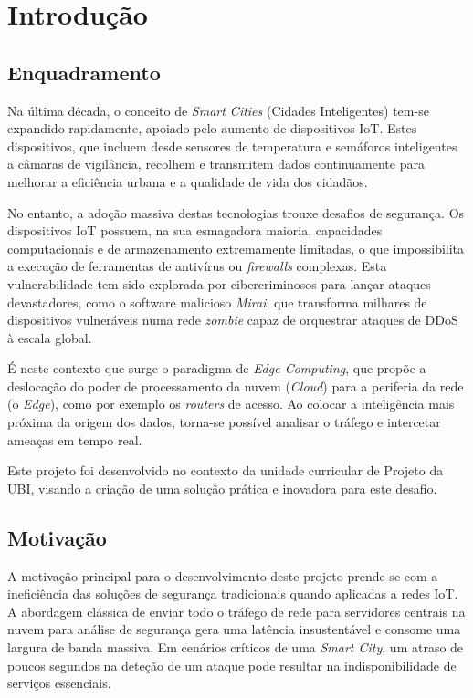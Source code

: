 \chapter{Introdução}
\label{chap:intro}

\section{Enquadramento}
\label{sec:amb}

Na última década, o conceito de \textit{Smart Cities} (Cidades Inteligentes) tem-se expandido rapidamente, apoiado pelo aumento de dispositivos \ac{IoT}. Estes dispositivos, que incluem desde sensores de temperatura e semáforos inteligentes a câmaras de vigilância, recolhem e transmitem dados continuamente para melhorar a eficiência urbana e a qualidade de vida dos cidadãos.

No entanto, a adoção massiva destas tecnologias trouxe desafios de segurança. Os dispositivos \ac{IoT} possuem, na sua esmagadora maioria, capacidades computacionais e de armazenamento extremamente limitadas, o que impossibilita a execução de ferramentas de antivírus ou \textit{firewalls} complexas. Esta vulnerabilidade tem sido explorada por cibercriminosos para lançar ataques devastadores, como o software malicioso \textit{Mirai}, que transforma milhares de dispositivos vulneráveis numa rede \textit{zombie} capaz de orquestrar ataques de \ac{DDoS} à escala global.

É neste contexto que surge o paradigma de \textit{Edge Computing}, que propõe a deslocação do poder de processamento da nuvem (\textit{Cloud}) para a periferia da rede (o \textit{Edge}), como por exemplo os \textit{routers} de acesso. Ao colocar a inteligência mais próxima da origem dos dados, torna-se possível analisar o tráfego e intercetar ameaças em tempo real.

Este projeto foi desenvolvido no contexto da unidade curricular de Projeto da \ac{UBI}, visando a criação de uma solução prática e inovadora para este desafio.

\section{Motivação}
\label{sec:mot}

A motivação principal para o desenvolvimento deste projeto prende-se com a ineficiência das soluções de segurança tradicionais quando aplicadas a redes \ac{IoT}. A abordagem clássica de enviar todo o tráfego de rede para servidores centrais na nuvem para análise de segurança gera uma latência insustentável e consome uma largura de banda massiva. Em cenários críticos de uma \textit{Smart City}, um atraso de poucos segundos na deteção de um ataque pode resultar na indisponibilidade de serviços essenciais.


